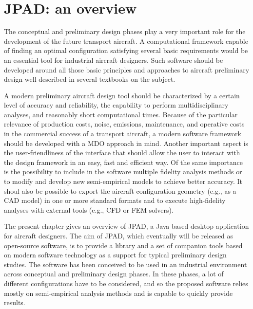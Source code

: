 \chapter{JPAD: an overview}
\label{chap1}

The conceptual and preliminary design phases play a very important role for the development of the future transport aircraft. A computational framework capable of finding an optimal configuration satisfying several basic requirements would be an essential tool for industrial aircraft designers. Such software should be developed around all those basic principles and approaches to aircraft preliminary design well described in several textbooks on the subject. \cite{nicolai2010fundamentals}\cite{roskamAirplane}\cite{torenbeekAAD}

\bigskip
\noindent
A modern preliminary aircraft design tool should be characterized by a certain level of accuracy and reliability, the capability to perform multidisciplinary analyses, and reasonably short computational times. Because of the particular relevance of production costs, noise, emissions, maintenance, and operative costs in the commercial success of a transport aircraft, a modern software framework should be developed with a \gls{MDO} approach in mind. Another important aspect is the user-friendliness of the interface that should allow the user to interact with the design framework in an easy, fast and efficient way. Of the same importance is the possibility to include in the software multiple fidelity analysis methods or to modify and develop new semi-empirical models to achieve better accuracy. It shoul also be possible to export the aircraft configuration geometry (e.g., as a \gls{CAD} model) in one or more standard formats and to execute high-fidelity analyses with external tools (e.g., \gls{CFD} or \gls{FEM} solvers).

\bigskip
\noindent
The present chapter gives an overview of \gls{JPAD}, a Java-based desktop application for aircraft designers. The aim of \gls{JPAD}, which eventually will be released as open-source software, is to provide a library and a set of companion tools based on modern software technology as a support for typical preliminary design studies. The software has been conceived to be used in an industrial environment across conceptual and preliminary design phases. In these phases, a lot of different configurations have to be considered, and so the proposed software relies mostly on semi-empirical analysis methods and is capable to quickly provide results.

